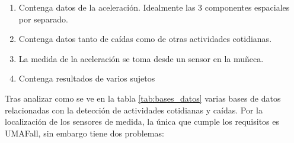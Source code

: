 \begin{enumerate}
  \item Contenga datos de la aceleración. Idealmente las 3 componentes espaciales por separado.
  \item Contenga datos tanto de caídas como de otras actividades cotidianas.
  \item La medida de la aceleración se toma desde un sensor en la muñeca.
  \item Contenga resultados de varios sujetos
\end{enumerate}

Tras analizar como se ve en la tabla \ref{tab:bases_datos} varias bases de datos relacionadas con la detección de actividades cotidianas y caídas. Por la localización de los sensores de medida, la única que cumple los requisitos es UMAFall, sin embargo tiene dos problemas:
